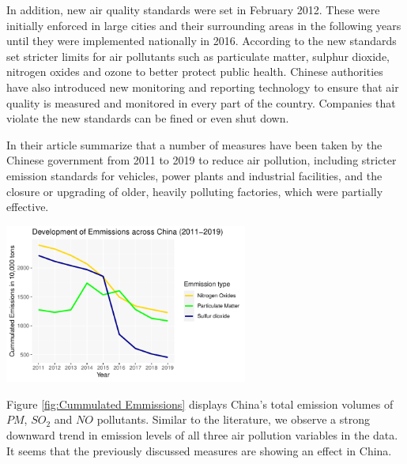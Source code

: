 \documentclass[
]{article}
\begin{document}
	In addition, new air quality standards were set in February 2012. These were initially enforced in large cities and their surrounding areas in the following years until they were implemented nationally in 2016. According to the \cite{Transport2012} new standards set stricter limits for air pollutants such as particulate matter, sulphur dioxide, nitrogen oxides and ozone to better protect public health. Chinese authorities have also introduced new monitoring and reporting technology to ensure that air quality is measured and monitored in every part of the country. Companies that violate the new standards can be fined or even shut down. 
	
	In their article \cite{ijerph13121219} summarize that a number of measures have been taken by the Chinese government from 2011 to 2019 to reduce air pollution, including stricter emission standards for vehicles, power plants and industrial facilities, and the closure or upgrading of older, heavily polluting factories, which were partially effective. 
	
	\begin{center}
	\includegraphics[width=0.6\textwidth]{Development of Emmissions China total.pdf} 
	\label{fig:Cummulated Emmissions}
	\end{center}

	Figure \ref{fig:Cummulated Emmissions} displays China's total emission volumes of $PM$, $SO_2$ and $NO$ pollutants. Similar to the literature, we observe a strong downward trend in emission levels of all three air pollution variables in the data. It seems that the previously discussed measures are showing an effect in China. 
\end{document}
